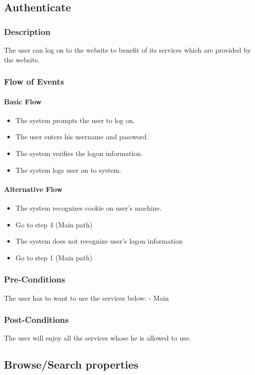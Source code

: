 \documentclass[a4paper,12pt]{article}
\begin{document}
\subsection{Authenticate}
\subsubsection{Description}
The user can log on to the website to benefit of its services which are provided by the website.
\subsubsection{Flow of Events}
\paragraph{Basic Flow}
\begin{itemize}
\item The system prompts the user to log on.
\item The user enters his username and password. 
\item The system verifies the logon information. 
\item The system logs user on to system.
\end{itemize}

\paragraph{Alternative Flow}
\begin{itemize}
\item The system recognizes cookie on user's machine. 
\item Go to step 4 (Main path)
\item The system does not recognize user's logon information 
\item Go to step 1 (Main path)
\end{itemize}

\subsubsection{Pre-Conditions}
The user has to want to use the services below:
- Main 
\subsubsection{Post-Conditions}
The user will enjoy all the services whose he is allowed to use.


\subsection{Browse/Search properties}
\end{document}
